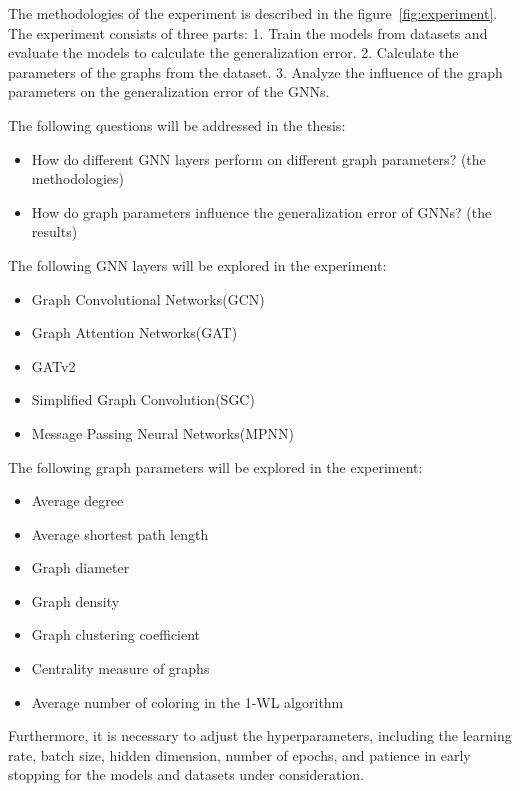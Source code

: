 \documentclass{article}
\begin{document}
The methodologies of the experiment is described in the figure~\ref{fig:experiment}. The experiment consists of three parts: 1. Train the models from datasets and evaluate the models to calculate the generalization error. 2. Calculate the parameters of the graphs from the dataset. 3. Analyze the influence of the graph parameters on the generalization error of the GNNs.

The following questions will be addressed in the thesis:
\begin{itemize}[noitemsep]
    \item How do different GNN layers perform on different graph parameters? (the methodologies)
    \item How do graph parameters influence the generalization error of GNNs? (the results)
\end{itemize}

The following GNN layers will be explored in the experiment:
\begin{itemize}[noitemsep]
    \item Graph Convolutional Networks(GCN)~\cite{kipf2016semi}
    \item Graph Attention Networks(GAT)~\cite{velickovic2020pointer}
    \item GATv2~\cite{brody2021attentive}
    \item Simplified Graph Convolution(SGC)~\cite{wu2019simplifying}
    \item Message Passing Neural Networks(MPNN)~\cite{gilmer2017neural}
\end{itemize}

The following graph parameters will be explored in the experiment:
\begin{itemize}[noitemsep]
    \item Average degree
    \item Average shortest path length
    \item Graph diameter
    \item Graph density
    \item Graph clustering coefficient
    \item Centrality measure of graphs
    \item Average number of coloring in the 1-WL algorithm
\end{itemize}

Furthermore, it is necessary to adjust the hyperparameters, including the learning rate, batch size, hidden dimension, number of epochs, and patience in early stopping for the models and datasets under consideration.
\end{document}
